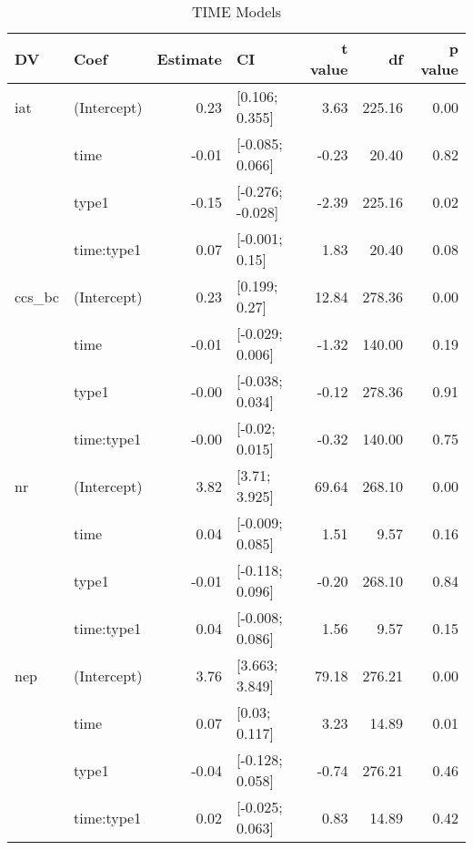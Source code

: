 \begin{table}[ht]
\centering
\begin{tabular}{llrlrrr}
  \hline
DV & Coef & Estimate & CI & t value & df & p value \\ 
  \hline
iat & (Intercept) & 0.23 & [0.106; 0.355] & 3.63 & 225.16 & 0.00 \\ 
   & time & -0.01 & [-0.085; 0.066] & -0.23 & 20.40 & 0.82 \\ 
   & type1 & -0.15 & [-0.276; -0.028] & -2.39 & 225.16 & 0.02 \\ 
   & time:type1 & 0.07 & [-0.001; 0.15] & 1.83 & 20.40 & 0.08 \\ 
   \hline
ccs\_bc & (Intercept) & 0.23 & [0.199; 0.27] & 12.84 & 278.36 & 0.00 \\ 
   & time & -0.01 & [-0.029; 0.006] & -1.32 & 140.00 & 0.19 \\ 
   & type1 & -0.00 & [-0.038; 0.034] & -0.12 & 278.36 & 0.91 \\ 
   & time:type1 & -0.00 & [-0.02; 0.015] & -0.32 & 140.00 & 0.75 \\ 
   \hline
nr & (Intercept) & 3.82 & [3.71; 3.925] & 69.64 & 268.10 & 0.00 \\ 
   & time & 0.04 & [-0.009; 0.085] & 1.51 & 9.57 & 0.16 \\ 
   & type1 & -0.01 & [-0.118; 0.096] & -0.20 & 268.10 & 0.84 \\ 
   & time:type1 & 0.04 & [-0.008; 0.086] & 1.56 & 9.57 & 0.15 \\ 
   \hline
nep & (Intercept) & 3.76 & [3.663; 3.849] & 79.18 & 276.21 & 0.00 \\ 
   & time & 0.07 & [0.03; 0.117] & 3.23 & 14.89 & 0.01 \\ 
   & type1 & -0.04 & [-0.128; 0.058] & -0.74 & 276.21 & 0.46 \\ 
   & time:type1 & 0.02 & [-0.025; 0.063] & 0.83 & 14.89 & 0.42 \\ 
   \hline
\end{tabular}
\caption{TIME Models } 
\label{tab:time-models}
\end{table}
